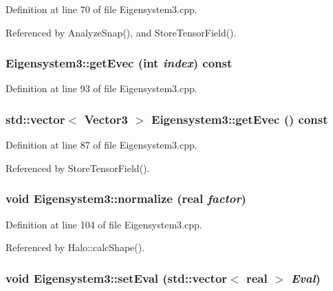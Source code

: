 Definition at line 70 of file Eigensystem3.cpp.



Referenced by AnalyzeSnap(), and StoreTensorField().

\subsubsection[{getEvec}]{ Eigensystem3::getEvec (int {\em index}) const}\label{classEigensystem3_ad3be2903d6b0f1c3513d2e920f08faae}


Definition at line 93 of file Eigensystem3.cpp.

\subsubsection[{getEvec}]{\setlength{\rightskip}{0pt plus 5cm}std::vector$<$ {\bf Vector3} $>$ Eigensystem3::getEvec () const}\label{classEigensystem3_a66bba9e069680e1fd2bbe66220fc13c8}


Definition at line 87 of file Eigensystem3.cpp.



Referenced by StoreTensorField().

\subsubsection[{normalize}]{\setlength{\rightskip}{0pt plus 5cm}void Eigensystem3::normalize ({\bf real} {\em factor})}\label{classEigensystem3_abae2814e44087582c68ea7511f5fd07d}


Definition at line 104 of file Eigensystem3.cpp.



Referenced by Halo::calcShape().

\subsubsection[{setEval}]{\setlength{\rightskip}{0pt plus 5cm}void Eigensystem3::setEval (std::vector$<$ {\bf real} $>$ {\em Eval})}\label{classEigensystem3_a059896de8f00f94f929019a87253ef28}


